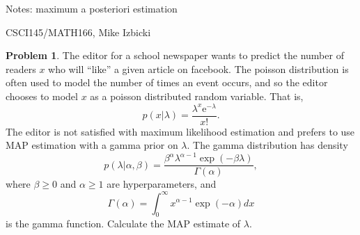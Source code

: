\documentclass[10pt]{article}
\theoremstyle{definition}
\newtheorem{problem}{Problem}
\begin{document}
\begin{center}
    {
\Large
Notes: maximum a posteriori estimation
}

    \vspace{0.1in}
CSCI145/MATH166, Mike Izbicki

    \vspace{0.1in}
\end{center}

\begin{problem}
    The editor for a school newspaper wants to predict the number of readers $x$ who will ``like'' a given article on facebook.
    The poisson distribution is often used to model the number of times an event occurs,
    and so the editor chooses to model $x$ as a poisson distributed random variable.
    That is, 
    \begin{equation}
        p(x|\lambda) = \frac{\lambda^x \mathrm{e}^{-\lambda}}{x!}
        .
    \end{equation}
    The editor is not satisfied with maximum likelihood estimation and prefers to use MAP estimation with a gamma prior on $\lambda$.
    The gamma distribution has density
    \begin{equation}
        p(\lambda|\alpha,\beta) = \frac{\beta^\alpha \lambda^{\alpha-1}\exp(-\beta\lambda)}{\Gamma(\alpha)}
        ,
    \end{equation}
    where $\beta\ge0$ and $\alpha\ge1$ are hyperparameters, and 
    \begin{equation}
        \Gamma(\alpha) = \int_0^\infty x^{\alpha-1}\exp(-\alpha) dx
    \end{equation}
    is the gamma function.
    Calculate the MAP estimate of $\lambda$.
\end{problem}
\end{document}
